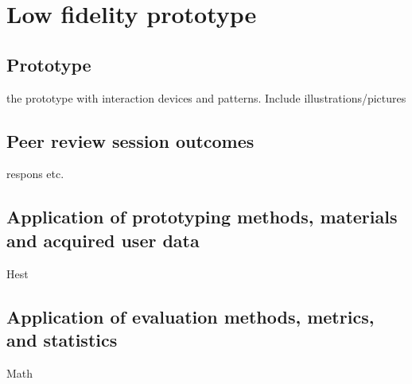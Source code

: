 \chapter{Low fidelity prototype}

\section{Prototype}
the prototype with interaction devices and patterns. Include illustrations/pictures

\section{Peer review session outcomes}
respons etc.

\section{Application of prototyping methods, materials and acquired user data}
Hest

\section{Application of evaluation methods, metrics, and statistics}
Math